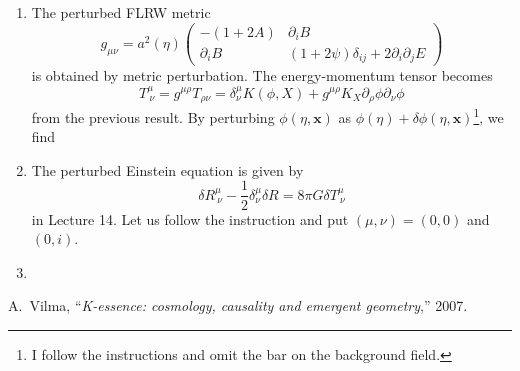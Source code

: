 \documentclass[a4paper,pdftex,10pt]{article}
\begin{document}
\begin{enumerate}
  \item
        The perturbed FLRW metric
        \begin{equation}
          g_{\mu\nu}
          =
          a^2(\eta)
          \begin{pmatrix}
            -(1+2A)       & \partial_{i}B                                   \\
            \partial_{i}B & (1+2\psi)\delta_{ij}+2\partial_{i}\partial_{j}E
          \end{pmatrix}
        \end{equation}
        is obtained by metric perturbation. The energy-momentum tensor becomes
        \begin{equation}
          T^{\mu}_{\ \nu}
          =
          g^{\mu\rho}T_{\rho\nu}
          =
          \delta^{\mu}_{\nu}K(\phi,X)
          +
          g^{\mu\rho}
          K_{X}
          \partial_{\rho}\phi\partial_{\nu}\phi
          \label{eqn:upperd_energy-momentum_tensor}
        \end{equation}
        from the previous result. By perturbing $\phi(\eta,\bm{x})$ as $\phi(\eta)+\delta\phi(\eta,\bm{x})$\footnote{
          I follow the instructions and omit the bar on the background field.
        }, we find

        \clearpage
  \item
        The perturbed Einstein equation is given by
        \begin{equation}
          \delta R^{\mu}_{\ \nu}
          -
          \frac{1}{2}\delta^{\mu}_{\nu}\delta R
          =
          8\pi G\delta T^{\mu}_{\ \nu}
        \end{equation}
        in Lecture 14. Let us follow the instruction and put $(\mu,\nu)=(0,0)$ and $(0,i)$.

  \item





\end{enumerate}


\clearpage
\begin{thebibliography}{99}
  A.~Vilma,
  ``\textit{K-essence: cosmology, causality and emergent geometry},''
  2007.
\end{thebibliography}



% 
% 

\end{document}
